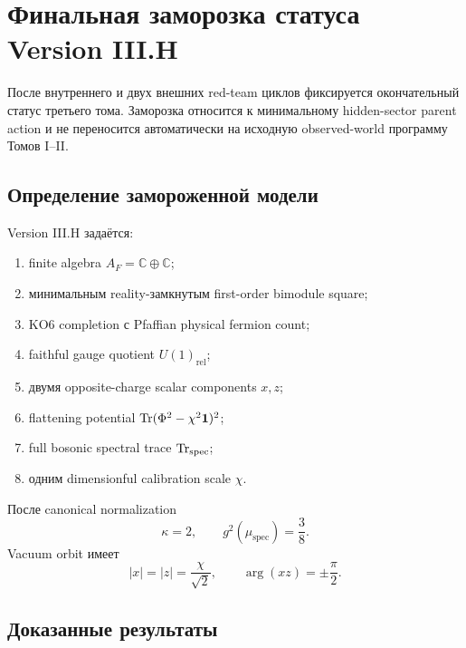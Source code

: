 \chapter{Финальная заморозка статуса Version III.H}

После внутреннего и двух внешних red-team циклов фиксируется окончательный
статус третьего тома. Заморозка относится к минимальному hidden-sector
parent action и не переносится автоматически на исходную observed-world
программу Томов I--II.

\section{Определение замороженной модели}

Version III.H задаётся:
\begin{enumerate}
 \item finite algebra \(A_F=\mathbb C\oplus\mathbb C\);
 \item минимальным reality-замкнутым first-order bimodule square;
 \item KO6 completion с Pfaffian physical fermion count;
 \item faithful gauge quotient \(U(1)_{\mathrm{rel}}\);
 \item двумя opposite-charge scalar components \(x,z\);
 \item flattening potential
 \(\operatorname{Tr}(\Phi^2-\chi^2\mathbf1)^2\);
 \item full bosonic spectral trace \(\operatorname{Tr}_{\mathrm{spec}}\);
 \item одним dimensionful calibration scale \(\chi\).
\end{enumerate}

После canonical normalization
\begin{equation}
 \kappa=2,
 \qquad
 g^2(\mu_{\mathrm{spec}})=\frac38.
\end{equation}
Vacuum orbit имеет
\begin{equation}
 |x|=|z|=\frac{\chi}{\sqrt2},
 \qquad
 \arg(xz)=\pm\frac{\pi}{2}.
\end{equation}

\section{Доказанные результаты}

